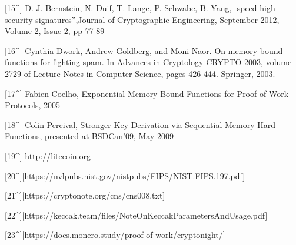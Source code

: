 {[}15\^{}{]} D. J. Bernstein, N. Duif, T. Lange, P. Schwabe, B. Yang,
\High-speed high-security signatures'',Journal of Cryptographic
Engineering, September 2012, Volume 2, Issue 2, pp 77-89

{[}16\^{}{]} Cynthia Dwork, Andrew Goldberg, and Moni Naor. On
memory-bound functions for fighting spam. In Advances in Cryptology
\textbar{} CRYPTO 2003, volume 2729 of Lecture Notes in Computer
Science, pages 426-444. Springer, 2003.

{[}17\^{}{]} Fabien Coelho, Exponential Memory-Bound Functions for Proof
of Work Protocols, 2005

{[}18\^{}{]} Colin Percival, Stronger Key Derivation via Sequential
Memory-Hard Functions, presented at BSDCan'09, May 2009

{[}19\^{}{]} http://litecoin.org

{[}20\^{}{]}{[}https://nvlpubs.nist.gov/nistpubs/FIPS/NIST.FIPS.197.pdf{]}

{[}21\^{}{]}{[}https://cryptonote.org/cns/cns008.txt{]}

{[}22\^{}{]}{[}https://keccak.team/files/NoteOnKeccakParametersAndUsage.pdf{]}

{[}23\^{}{]}{[}https://docs.monero.study/proof-of-work/cryptonight/{]}


